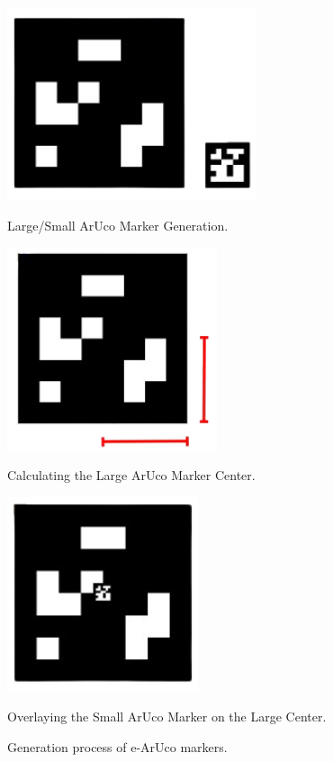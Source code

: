     \begin{figure}[H]
        \centering
        \begin{minipage}{0.3\textwidth}
            \centering
            \includegraphics[width=0.65\textwidth]{pictures/pose_1.png}
            \caption{Large/Small ArUco Marker Generation.}
            \label{fig:imagen1}
        \end{minipage}
        \hfill
        \begin{minipage}{0.3\textwidth}
            \centering
            \includegraphics[width=0.55\textwidth]{pictures/pose_2.png}
            \caption{Calculating the Large ArUco Marker Center.}
            \label{fig:imagen2}
        \end{minipage}
        \hfill
        \begin{minipage}{0.3\textwidth}
            \centering
            \includegraphics[width=0.5\textwidth]{pictures/pose_3.png}
            \caption{Overlaying the Small ArUco Marker on the Large Center.}
            \label{fig:imagen2}
        \end{minipage}
        \caption{Generation process of e-ArUco markers.}
    \end{figure}

